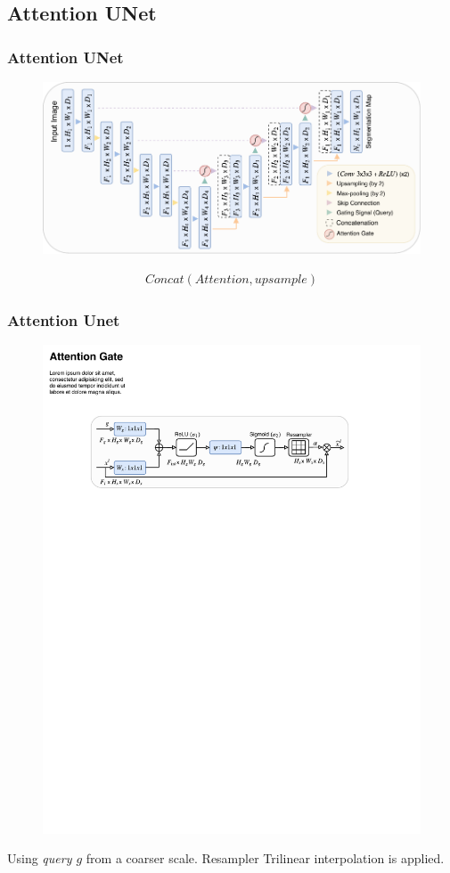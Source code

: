 \documentclass[]{beamer}
\begin{document}
\subsection{Attention UNet}
\begin{frame}
    \frametitle{Attention UNet}
    \begin{figure}
        \centering
        \includegraphics[scale = 0.7]{figure4.pdf}
    \end{figure}
    \begin{align*}
        Concat(Attention, upsample)
    \end{align*}
\end{frame}
\begin{frame}
    \frametitle{Attention Unet}
    \begin{figure}
        \centering
        \includegraphics[scale = 0.9]{figure3.pdf}
    \end{figure}
    Using \emph{query $g$} from a coarser scale.
    Resampler\: Trilinear interpolation is applied.
\end{frame}
\end{document}
